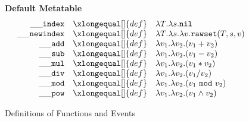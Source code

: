 \newcommand{\aFunction}[2]{\lambda{#1}.{#2}}


\begin{figure}[P]
\caption{Definitions of Functions and Events}
{\bf Default Metatable}
\label{fig:FW2.1metamethods}
\[
\begin{array}{rclcl}
  {\tt \_\_index}  & \xlongequal[]{def} & \aFunction{T}{\aFunction{s}{\tt nil}}\\
  
  {\tt \_\_newindex} & \xlongequal[]{def}  & \aFunction{T}{\aFunction{s}{\aFunction{v}{{\tt rawset}(T,s,v)}}}\\
 {\tt \_\_add}   & \xlongequal[]{def}  & \aFunction{v_1}{\aFunction{v_2}{(v_1+v_2)}} \\
 {\tt \_\_sub}   & \xlongequal[]{def}  & \aFunction{v_1}{\aFunction{v_2}{(v_1-v_2)}} \\
 {\tt \_\_mul}   & \xlongequal[]{def}  & \aFunction{v_1}{\aFunction{v_2}{(v_1*v_2)}} \\
 {\tt \_\_div}   & \xlongequal[]{def}  & \aFunction{v_1}{\aFunction{v_2}{(v_1/v_2)}} \\
 {\tt \_\_mod}   & \xlongequal[]{def}  & \aFunction{v_1}{\aFunction{v_2}{(v_1~{\tt mod}~v_2)}} \\
 {\tt \_\_pow}   & \xlongequal[]{def}  & \aFunction{v_1}{\aFunction{v_2}{(v_1 \wedge v_2)}} \\
         
\end{array}
\]
\end{figure}
